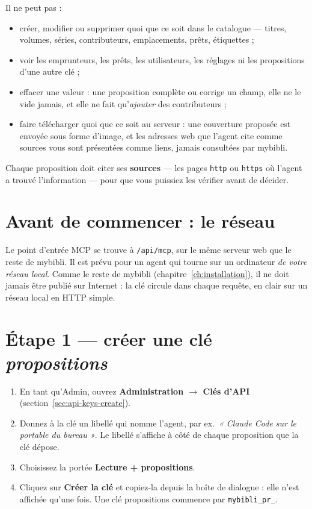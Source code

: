 Il ne peut pas :

\begin{itemize}
  \item créer, modifier ou supprimer quoi que ce soit dans le
        catalogue --- titres, volumes, séries, contributeurs,
        emplacements, prêts, étiquettes ;
  \item voir les emprunteurs, les prêts, les utilisateurs, les
        réglages ni les propositions d'une autre clé ;
  \item effacer une valeur : une proposition complète ou corrige un
        champ, elle ne le vide jamais, et elle ne fait
        qu'\emph{ajouter} des contributeurs ;
  \item faire télécharger quoi que ce soit au serveur : une
        couverture proposée est envoyée sous forme d'image, et les
        adresses web que l'agent cite comme sources vous sont
        présentées comme liens, jamais consultées par mybibli.
\end{itemize}

Chaque proposition doit citer ses \textbf{sources} --- les pages
\texttt{http} ou \texttt{https} où l'agent a trouvé l'information ---
pour que vous puissiez les vérifier avant de décider.

\section{Avant de commencer : le réseau}
\label{sec:agents-network}

Le point d'entrée MCP se trouve à
\texttt{/api/mcp}, sur le même
serveur web que le reste de mybibli. Il est prévu pour un agent qui
tourne sur un ordinateur \emph{de votre réseau local}. Comme le reste
de mybibli (chapitre~\ref{ch:installation}), il ne doit jamais être
publié sur Internet : la clé circule dans chaque requête, en clair
sur un réseau local en HTTP simple.

\section{Étape 1 --- créer une clé \emph{propositions}}
\label{sec:agents-key}

\begin{enumerate}
  \item En tant qu'Admin, ouvrez \textbf{Administration
        \(\rightarrow\) Clés d'API} (section~\ref{sec:api-keys-create}).
  \item Donnez à la clé un libellé qui nomme l'agent, par ex.\
        \emph{« Claude Code sur le portable du bureau »}. Le libellé
        s'affiche à côté de chaque proposition que la clé dépose.
  \item Choisissez la portée \textbf{Lecture +
        propositions}.
  \item Cliquez sur \textbf{Créer la clé} et copiez-la depuis la
        boîte de dialogue : elle n'est affichée qu'une fois. Une clé
        propositions commence par \texttt{mybibli\_pr\_}.
\end{enumerate}

